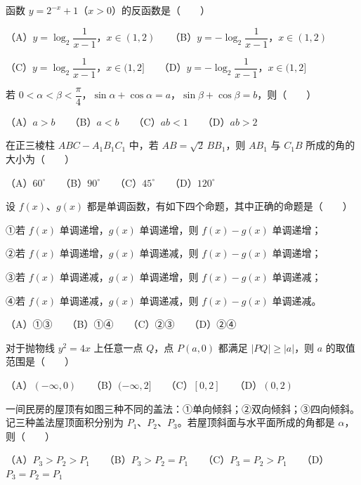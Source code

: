 \begin{question}
函数 $y=2^{-x}+1$（$x>0$）的反函数是\mbox{（　　）}

（A）$y=\log_2\dfrac1{x-1}$，$x\in(1,2)$　　（B）$y=-\log_2\dfrac1{x-1}$，$x\in(1,2)$

（C）$y=\log_2\dfrac1{x-1}$，$x\in(1,2]$　　（D）$y=-\log_2\dfrac1{x-1}$，$x\in(1,2]$

\end{question}
\begin{question}
若 $0<\alpha<\beta<\dfrac\pi4$，$\sin\alpha+\cos\alpha=a$，$\sin\beta+\cos\beta=b$，则\mbox{（　　）}

（A）$a>b$　　（B）$a<b$　　（C）$ab<1$　　（D）$ab>2$

\end{question}
\begin{question}
在正三棱柱 $ABC-A_1B_1C_1$ 中，若 $AB=\sqrt2\,BB_1$，则 $AB_1$ 与 $C_1B$ 所成的角的大小为\mbox{（　　）}

（A）$60^\circ$　　（B）$90^\circ$　　（C）$45^\circ$　　（D）$120^\circ$

\end{question}
\begin{question}
设 $f(x)$、$g(x)$ 都是单调函数，有如下四个命题，其中正确的命题是\mbox{（　　）}

①若 $f(x)$ 单调递增，$g(x)$ 单调递增，则 $f(x)-g(x)$ 单调递增；

②若 $f(x)$ 单调递增，$g(x)$ 单调递减，则 $f(x)-g(x)$ 单调递增；

③若 $f(x)$ 单调递减，$g(x)$ 单调递增，则 $f(x)-g(x)$ 单调递减；

④若 $f(x)$ 单调递减，$g(x)$ 单调递减，则 $f(x)-g(x)$ 单调递减。

（A）①③　　（B）①④　　（C）②③　　（D）②④

\end{question}
\begin{question}
对于抛物线 $y^2=4x$ 上任意一点 $Q$，点 $P(a,0)$ 都满足 $|PQ|\ge|a|$，则 $a$ 的取值范围是\mbox{（　　）}

（A）$(-\infty,0)$　　（B）$(-\infty,2]$　　（C）$[0,2]$　　（D）$(0,2)$

\Needspace{0.4\textheight}
\end{question}
\begin{question}
一间民房的屋顶有如图三种不同的盖法：①单向倾斜；②双向倾斜；③四向倾斜。记三种盖法屋顶面积分别为 $P_1$、$P_2$、$P_3$。若屋顶斜面与水平面所成的角都是 $\alpha$，则\mbox{（　　）}
\nopagebreak[4]
\begin{center}\end{center}
\nopagebreak[4]
（A）$P_3>P_2>P_1$　　（B）$P_3>P_2=P_1$　　（C）$P_3=P_2>P_1$　　（D）$P_3=P_2=P_1$

\Needspace{0.4\textheight}
\end{question}
